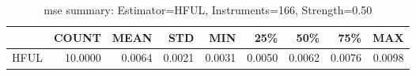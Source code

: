 \begin{table}[ht]
\centering
\caption{mse summary: Estimator=HFUL, Instruments=166, Strength=0.50}
\begin{tabular}{lrrrrrrrr}
\toprule
 & COUNT & MEAN & STD & MIN & 25\% & 50\% & 75\% & MAX \\
\midrule
HFUL & 10.0000 & 0.0064 & 0.0021 & 0.0031 & 0.0050 & 0.0062 & 0.0076 & 0.0098 \\
\bottomrule
\end{tabular}
\end{table}
